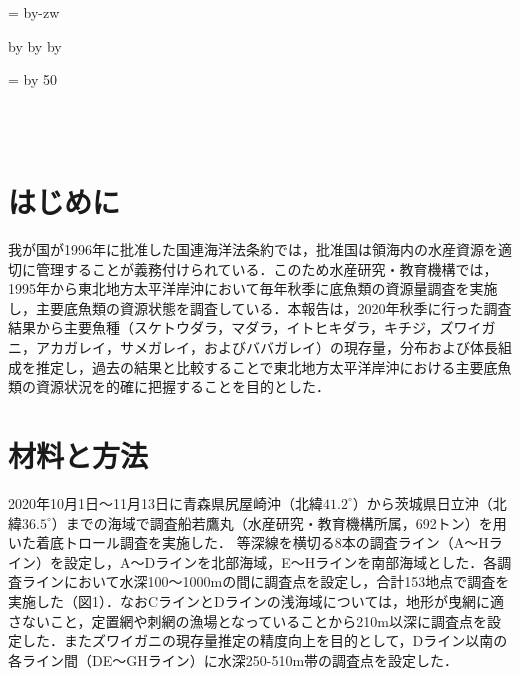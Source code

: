 \documentclass[11pt]{article} %
\makeatletter
\def\mojiparline#1{
\newcounter{mpl}
\setcounter{mpl}{#1}
\@tempdima=\linewidth
\advance\@tempdima by-\value{mpl}zw
\addtocounter{mpl}{-1}
\divide\@tempdima by \value{mpl}
\advance\kanjiskip by\@tempdima
\advance\parindent by\@tempdima
}
\def\linesparpage#1{
\baselineskip=\textheight
\divide\baselineskip by #1
}
\makeatother
\begin{document}

\mojiparline{40} %
\linesparpage{50} %

\begin{linenumbers}
\\
\\


\section{はじめに}
我が国が1996年に批准した国連海洋法条約では，批准国は領海内の水産資源を適切に管理することが義務付けられている．このため水産研究・教育機構では，1995年から東北地方太平洋岸沖において毎年秋季に底魚類の資源量調査を実施し，主要底魚類の資源状態を調査している．本報告は，2020年秋季に行った調査結果から主要魚種（スケトウダラ，マダラ，イトヒキダラ，キチジ，ズワイガニ，アカガレイ，サメガレイ，およびババガレイ）の現存量，分布および体長組成を推定し，過去の結果と比較することで東北地方太平洋岸沖における主要底魚類の資源状況を的確に把握することを目的とした．

\section{材料と方法}
2020年10月1日～11月13日に青森県尻屋崎沖（北緯$\textrm{41.2}^\circ$）から茨城県日立沖（北緯$\textrm{36.5}^\circ$）までの海域で調査船若鷹丸（水産研究・教育機構所属，692トン）を用いた着底トロール調査を実施した．
等深線を横切る8本の調査ライン（A～Hライン）を設定し，A～Dラインを北部海域，E～Hラインを南部海域とした．各調査ラインにおいて水深100～1000mの間に調査点を設定し，合計153地点で調査を実施した（図1）．なおCラインとDラインの浅海域については，地形が曳網に適さないこと，定置網や刺網の漁場となっていることから210m以深に調査点を設定した．またズワイガニの現存量推定の精度向上を目的として，Dライン以南の各ライン間（DE〜GHライン）に水深250-510m帯の調査点を設定した．


\end{linenumbers}
\end{document}
